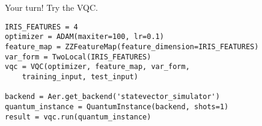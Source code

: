 \begin{frame}[fragile]{Your turn!}
Try the VQC. \bigskip

\begin{verbatim}
IRIS_FEATURES = 4
optimizer = ADAM(maxiter=100, lr=0.1)
feature_map = ZZFeatureMap(feature_dimension=IRIS_FEATURES)
var_form = TwoLocal(IRIS_FEATURES)
vqc = VQC(optimizer, feature_map, var_form, 
    training_input, test_input)

backend = Aer.get_backend('statevector_simulator')
quantum_instance = QuantumInstance(backend, shots=1)
result = vqc.run(quantum_instance)
\end{verbatim}
\end{frame}
